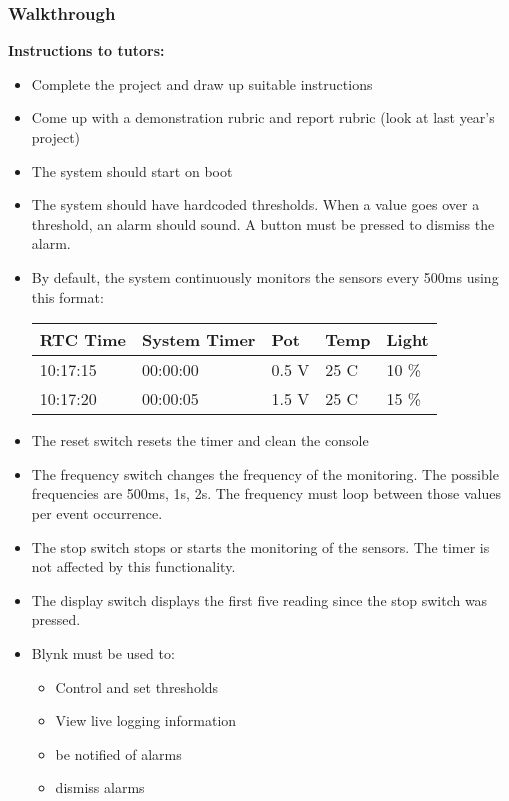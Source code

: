 \subsubsection{Walkthrough}
\textbf{Instructions to tutors:}
\begin{itemize}
    \item Complete the project and draw up suitable instructions
    \item Come up with a demonstration rubric and report rubric (look at last year's project)
    \item The system should start on boot
    \item The system should have hardcoded thresholds. When a value goes over a threshold, an alarm should sound. A button must be pressed to dismiss the alarm.
    \item By default, the system continuously monitors the sensors every 500ms using this format:
    \begin{table}[H]
    \centering
    \begin{tabular}{|l|l|l|l|l|}
    \hline
    RTC Time & System Timer & Pot   & Temp & Light \\ \hline
    10:17:15 & 00:00:00     & 0.5 V & 25 C & 10 \% \\ \hline
    10:17:20 & 00:00:05     & 1.5 V & 25 C & 15 \% \\ \hline
    \end{tabular}
    \end{table}
    \item The reset switch resets the timer and clean the console
    \item The frequency switch changes the frequency of the monitoring. The possible frequencies are 500ms, 1s, 2s. The frequency must loop between those values per event occurrence.
    \item The stop switch stops or starts the monitoring of the sensors. The timer is not affected by this functionality.
    \item The display switch displays the first five reading since the stop switch was pressed.
    \item Blynk must be used to:
    \begin{itemize}
        \item Control and set thresholds
        \item View live logging information
        \item be notified of alarms
        \item dismiss alarms
    \end{itemize}
\end{itemize}
